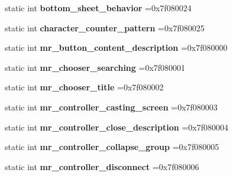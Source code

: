 \begin{DoxyCompactItemize}
static int {\bfseries bottom\+\_\+sheet\+\_\+behavior} =0x7f080024
\item 
\mbox{\label{classandroid_1_1support_1_1design_1_1R_1_1string_a4b3c657f127e271fc70cdd2e07d6e32c}} 
static int {\bfseries character\+\_\+counter\+\_\+pattern} =0x7f080025
\item 
\mbox{\label{classandroid_1_1support_1_1design_1_1R_1_1string_ac7550c54da4c6c90b1703aebe1367a61}} 
static int {\bfseries mr\+\_\+button\+\_\+content\+\_\+description} =0x7f080000
\item 
\mbox{\label{classandroid_1_1support_1_1design_1_1R_1_1string_a84cc11b241974d08c116bd440811ee95}} 
static int {\bfseries mr\+\_\+chooser\+\_\+searching} =0x7f080001
\item 
\mbox{\label{classandroid_1_1support_1_1design_1_1R_1_1string_ad8ee1fa075cd2ebf14fa7d89d82ebfd5}} 
static int {\bfseries mr\+\_\+chooser\+\_\+title} =0x7f080002
\item 
\mbox{\label{classandroid_1_1support_1_1design_1_1R_1_1string_a0ccd3c92522a86e0e7c9dfcf692b47ee}} 
static int {\bfseries mr\+\_\+controller\+\_\+casting\+\_\+screen} =0x7f080003
\item 
\mbox{\label{classandroid_1_1support_1_1design_1_1R_1_1string_a27ae76faae6701480b90ac7fec4f0484}} 
static int {\bfseries mr\+\_\+controller\+\_\+close\+\_\+description} =0x7f080004
\item 
\mbox{\label{classandroid_1_1support_1_1design_1_1R_1_1string_a02d704413e77202394715e71e586fe98}} 
static int {\bfseries mr\+\_\+controller\+\_\+collapse\+\_\+group} =0x7f080005
\item 
\mbox{\label{classandroid_1_1support_1_1design_1_1R_1_1string_a8cbb853c61e4beb0aaaf0515da021545}} 
static int {\bfseries mr\+\_\+controller\+\_\+disconnect} =0x7f080006
\item 

\end{DoxyCompactItemize}
